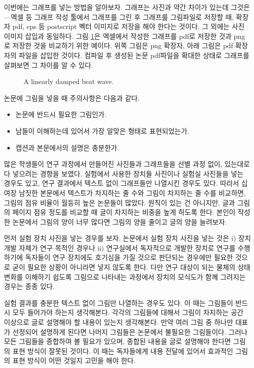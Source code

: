 \documentclass{gshs-report-v1.2}
\begin{document}
이번에는 그래프를 넣는 방법을 알아보자. 그래프는 사진과 약간 차이가 있는데 그것은---엑셀 등 그래프 작성 툴에서 그래프를 그린 후 그래프를 그림파일로 저장할 때, 확장자 pdf, eps 등 postscript 벡터 이미지로 저장을 해야 한다는 것이다. 그 외에는 사진 이미지 삽입과 동일하다. 그림 \ref{Fig01}은 엑셀에서 작성한 그래프를 pdf로 저장한 것과 png로 저장한 것을 비교하기 위한 예이다. 위쪽 그림은 png 확장자, 아래 그림은 pdf 확장자의 파일을 삽입한 것이다. 컴파일 후 생성된 논문 pdf파일을 확대한 상태로 그래프를 살펴보면 그 차이를 알 수 있다.


\begin{figure}[t]
	\begin{center}
		\caption{A linearly damped beat wave.} \label{Fig01}
	\end{center}
\end{figure}

논문에 그림을 넣을 때 주의사항은 다음과 같다.
\begin{itemize}
	\item{논문에 반드시 필요한 그림인가.}
	\item{남들이 이해하는데 있어서 가장 알맞은 형태로 표현되었는가.}
	\item{캡션과 본문에서의 설명은 충분한가.}
\end{itemize}
많은 학생들이 연구 과정에서 만들어진 사진들과 그래프들을 선별 과정 없이, 있는대로 다 넣으려는 경향을 보였다. 실험에서 사용한 장치들 사진이나 실험실 사진들을 넣는 경우도 있고, 연구 결과에서 텍스트 없이 그래프들만 나열시킨 경우도 있다. 따라서 십여장 남짓한 본문에서 텍스트가 차지하는 줄 수와 그림이 차지하는 줄 수를 비교하면, 그림의 점유 비율이 월등히 높은 논문들이 많았다. 원칙이 있는 건 아니지만, 글과 그림의 페이지 점유 정도를 비교할 때 글이 차지하는 비중을 높게 하도록 한다. 본인이 작성한 논문에서 그림의 양이 너무 많다면 그림의 양을 줄이고 글의 양을 늘려보자.

먼저 실험 장치 사진을 넣는 경우를 보자. 논문에서 실험 장치 사진을 넣는 것은 i) 장치 개발 자체가 연구 목적인 경우나 ii) 연구실에서 독자적으로 개발한 장치로 연구를 수행하기에 독자들이 연구 장치에도 호기심을 가질 것으로 판단되는 경우에만 필요한 것으로 굳이 필요한 상황이 아니라면 넣지 않도록 한다. 다만 연구 대상이 되는 물체의 상태 변화를 이해하기 쉽도록 그림으로 나타내는 과정에서 장치의 모식도가 함께 그려지는 경우는 종종 있다.

실험 결과를 충분한 텍스트 없이 그림만 나열하는 경우도 있다. 이 때는 그림들이 반드시 모두 들어가야 하는지 생각해본다. 각각의 그림들에 대해서 그림이 차지하는 공간 이상으로 글로 설명해야 할 내용이 있는지 생각해본다. 만약 여러 그림 중 하나만 대표가 선정되어 설명하게 된다면 나머지 그림들은 논문에서 불필요한 그림들이다. 그러나 모든 그림들을 종합하여 볼 필요가 있으며, 종합된 내용을 글로 설명해야 한다면 그림의 표현 방식이 잘못된 것이다. 이 때는 독자들에게 내용 전달에 있어서 효과적인 그림의 표현 방식이 어떤 것일지 고민을 해야 한다.
\end{document}
